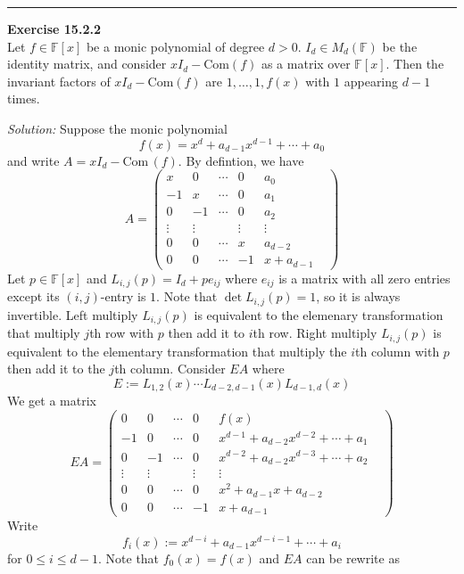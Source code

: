 \documentclass[a4paper, 12pt]{article}
\newenvironment{problem}[2][Exercise]
    { \begin{mdframed}[backgroundcolor=gray!20] \textbf{#1 #2} \\}
    {  \end{mdframed}}
\newenvironment{solution}
    {\textit{Solution:}}
    {}
\newcommand{\Com}{\text{Com}\,}
\begin{document}
\noindent\rule{7in}{2.8pt}
\begin{problem}{15.2.2}
Let \(f\in \mathbb{F}[x]\) be a monic polynomial of degree \(d>0\). \(I_d\in M_d(\mathbb{F})\) be the identity matrix, and consider \(xI_d-\text{Com}(f)\) as a matrix over \(\mathbb{F}[x]\). Then the 
invariant factors of \(xI_d-\text{Com}(f)\) are \(1,\ldots,1,f(x)\) with \(1\) appearing \(d-1\) times.    
\end{problem}
\begin{solution}
Suppose the monic polynomial 
\[f(x)=x^d+a_{d-1}x^{d-1}+\cdots+a_0\]
and write \(A=xI_d-\Com(f)\). By defintion, we have
\[A=\begin{pmatrix}
	x&0&\cdots&0&a_0\\ 
	-1&x&\cdots&0&a_1\\ 
	0&-1&\cdots&0&a_2\\ 
	\vdots&\vdots&&\vdots&\vdots&\\ 
	0&0&\cdots&x&a_{d-2}\\ 
	0&0&\cdots&-1&x+a_{d-1}
\end{pmatrix}\] 
Let \(p\in \mathbb{F}[x]\) and \(L_{i,j}(p)=I_d+pe_{ij}\) where \(e_{ij}\) is a matrix with all zero entries except its \((i,j)\)-entry is \(1\). Note that \(\det L_{i,j}(p)=1\), so it is always 
invertible. Left multiply \(L_{i,j}(p)\) is equivalent to the elemenary transformation that multiply \(j\)th row with \(p\) then add it to \(i\)th row. Right multiply 
\(L_{i,j}(p)\) is equivalent to the elementary transformation that multiply the \(i\)th column with \(p\) then add it to the \(j\)th column. Consider \(EA\) where 
\[E:=L_{1,2}(x)\cdots L_{d-2,d-1}(x)L_{d-1,d}(x)\]
We get a matrix 
\[EA=\begin{pmatrix}
	0&0&\cdots&0&f(x)\\ 
	-1&0&\cdots&0&x^{d-1}+a_{d-2}x^{d-2}+\cdots+a_1\\ 
	0&-1&\cdots&0&x^{d-2}+a_{d-2}x^{d-3}+\cdots+a_2\\ 
	\vdots&\vdots&&\vdots&\vdots&\\ 
	0&0&\cdots&0&x^2+a_{d-1}x+a_{d-2}\\ 
	0&0&\cdots&-1&x+a_{d-1}
\end{pmatrix}\]
Write
\[f_i(x):=x^{d-i}+a_{d-1}x^{d-i-1}+\cdots+a_i\]
for \(0\leq i\leq d-1\). Note that \(f_0(x)=f(x)\) and \(EA\) can be rewrite as 

\end{solution}
\end{document}
